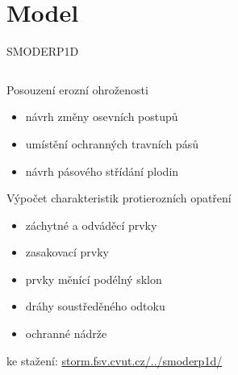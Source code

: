 \section{Model}

    \begin{frame}{SMODERP1D}
        \begin{columns}
            \begin{column}{0.5\textwidth}
                Posouzení erozní ohroženosti 
                \begin{itemize}
                    \item návrh změny osevních postupů
                    \item umístění ochranných travních pásů
                    \item návrh pásového střídání plodin
                \end{itemize}\vspace{1em}
                Výpočet charakteristik protierozních opatření
                \begin{itemize}
                    \item záchytné a odváděcí prvky
                    \item zasakovací prvky
                    \item prvky měnící podélný sklon
                    \item dráhy soustředěného odtoku
                    \item ochranné nádrže
                \end{itemize}\vspace{1em}
                ke stažení:
                \href{http://storm.fsv.cvut.cz/cinnost-katedry/volne-stazitelne-vysledky/smoderp/smoderp1d/?lang=cz}{storm.fsv.cvut.cz/../smoderp1d/}
            \end{column}
            \begin{column}{0.5\textwidth}

\end{column}
\end{columns}
\end{frame}
